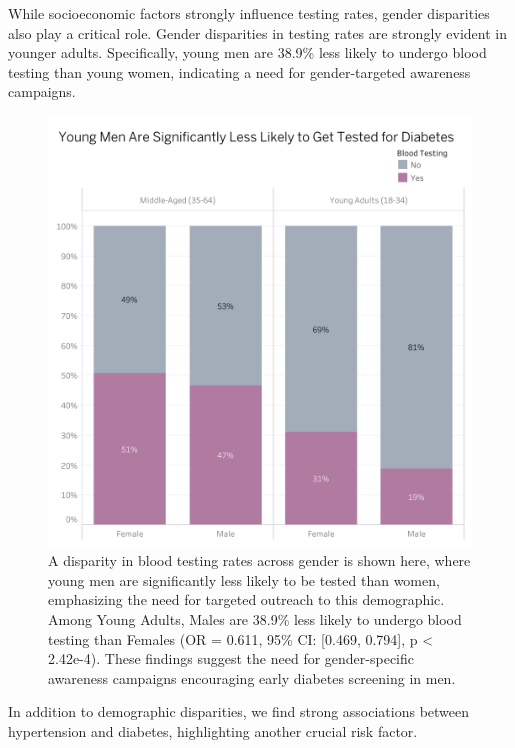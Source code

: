 \documentclass[
]{article}
\begin{document}
While socioeconomic factors strongly influence testing rates, gender
disparities also play a critical role. Gender disparities in testing
rates are strongly evident in younger adults. Specifically, young men
are 38.9\% less likely to undergo blood testing than young women,
indicating a need for gender-targeted awareness campaigns.

\begin{figure}[H]

{\centering \includegraphics[width=0.6\linewidth]{../figures/Gender Disparities in Diabetes Testing} 

}

\caption{A disparity in blood testing rates across gender is shown here, where young men are significantly less likely to be tested than women, emphasizing the need for targeted outreach to this demographic. Among Young Adults, Males are 38.9\% less likely to undergo blood testing than Females (OR = 0.611, 95\% CI: [0.469, 0.794], p < 2.42e-4). These findings suggest the need for gender-specific awareness campaigns encouraging early diabetes screening in men.}\label{fig:fig_gender_testing_disparity}
\end{figure}

In addition to demographic disparities, we find strong associations
between hypertension and diabetes, highlighting another crucial risk
factor.
\end{document}
